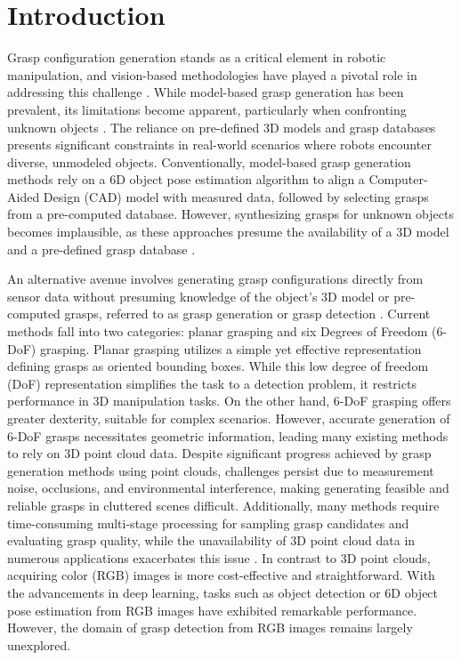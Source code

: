 \section{Introduction}
\label{sec:intro}

Grasp configuration generation stands as a critical element in robotic manipulation, and vision-based methodologies have played a pivotal role in addressing this challenge \cite{hoang2023grasp, hoang2022context, fang2020graspnet}. While model-based grasp generation has been prevalent, its limitations become apparent, particularly when confronting unknown objects \cite{du2021vision, hoang2020panoptic, hoang2020object, hoang2016sub}. The reliance on pre-defined 3D models and grasp databases presents significant constraints in real-world scenarios where robots encounter diverse, unmodeled objects. Conventionally, model-based grasp generation methods rely on a 6D object pose estimation algorithm to align a Computer-Aided Design (CAD) model with measured data, followed by selecting grasps from a pre-computed database. However, synthesizing grasps for unknown objects becomes implausible, as these approaches presume the availability of a 3D model and a pre-defined grasp database \cite{du2021vision}.

An alternative avenue involves generating grasp configurations directly from sensor data without presuming knowledge of the object's 3D model or pre-computed grasps, referred to as grasp generation or grasp detection \cite{ten2017grasp, fang2020graspnet, hoang2022context}. Current methods fall into two categories: planar grasping and six Degrees of Freedom (6-DoF) grasping. Planar grasping utilizes a simple yet effective representation defining grasps as oriented bounding boxes. While this low degree of freedom (DoF) representation simplifies the task to a detection problem, it restricts performance in 3D manipulation tasks. On the other hand, 6-DoF grasping offers greater dexterity, suitable for complex scenarios. However, accurate generation of 6-DoF grasps necessitates geometric information, leading many existing methods to rely on 3D point cloud data. Despite significant progress achieved by grasp generation methods using point clouds, challenges persist due to measurement noise, occlusions, and environmental interference, making generating feasible and reliable grasps in cluttered scenes difficult. Additionally, many methods require time-consuming multi-stage processing for sampling grasp candidates and evaluating grasp quality, while the unavailability of 3D point cloud data in numerous applications exacerbates this issue \cite{ten2017grasp, liang2019pointnetgpd, du2021vision}. In contrast to 3D point clouds, acquiring color (RGB) images is more cost-effective and straightforward. With the advancements in deep learning, tasks such as object detection \cite{zou2023object} or 6D object pose estimation \cite{marullo20236d} from RGB images have exhibited remarkable performance. However, the domain of grasp detection from RGB images remains largely unexplored.

